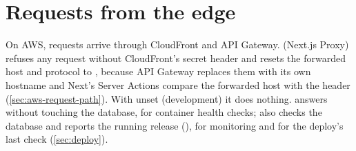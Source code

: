 \section{Requests from the edge}
On AWS, requests arrive through CloudFront and API Gateway.  (Next.js Proxy)
refuses any request without CloudFront's secret  header and resets the
forwarded host and protocol to , because API Gateway replaces them with its own
hostname and Next's Server Actions compare the forwarded host with the  header
(\cref{sec:aws-request-path}). With  unset (development) it does
nothing.  answers without touching the database, for container health
checks;  also checks the database and reports the running release
(), for monitoring and for the deploy's last check (\cref{sec:deploy}).

